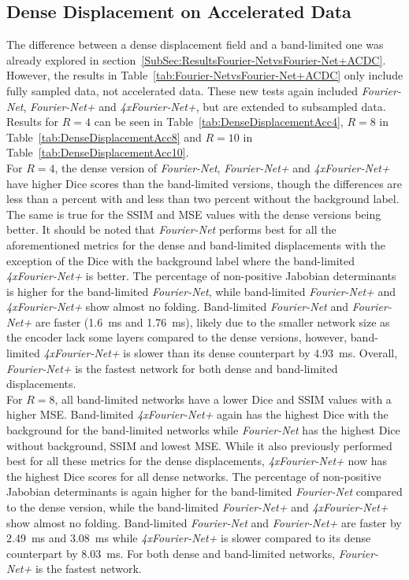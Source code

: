 \subsection{Dense Displacement on Accelerated Data} \label{SubSec:ResultsDenseDisplacementAcc}
The difference between a dense displacement field and a band-limited one was already explored in section~\ref{SubSec:ResultsFourier-NetvsFourier-Net+ACDC}. However, the results in Table~\ref{tab:Fourier-NetvsFourier-Net+ACDC} only include fully sampled data, not accelerated data. These new tests again included \emph{Fourier-Net}, \emph{Fourier-Net+} and \emph{4xFourier-Net+}, but are extended to subsampled data. Results for $R=4$ can be seen in Table~\ref{tab:DenseDisplacementAcc4}, $R=8$ in Table~\ref{tab:DenseDisplacementAcc8} and $R=10$ in Table~\ref{tab:DenseDisplacementAcc10}. \\
For $R=4$, the dense version of \emph{Fourier-Net}, \emph{Fourier-Net+} and \emph{4xFourier-Net+} have higher Dice scores than the band-limited versions, though the differences are less than a percent with and less than two percent without the background label. The same is true for the SSIM and MSE values with the dense versions being better. It should be noted that \emph{Fourier-Net} performs best for all the aforementioned metrics for the dense and band-limited displacements with the exception of the Dice with the background label where the band-limited \emph{4xFourier-Net+} is better. The percentage of non-positive Jabobian determinants is higher for the band-limited \emph{Fourier-Net}, while band-limited \emph{Fourier-Net+} and \emph{4xFourier-Net+} show almost no folding. 
Band-limited \emph{Fourier-Net} and \emph{Fourier-Net+} are faster (1.6~ms and 1.76~ms), likely due to the smaller network size as the encoder lack some layers compared to the dense versions, however, band-limited \emph{4xFourier-Net+} is slower than its dense counterpart by 4.93~ms. Overall, \emph{Fourier-Net+} is the fastest network for both dense and band-limited displacements.\\
For $R=8$, all band-limited networks have a lower Dice and SSIM values with a higher MSE. Band-limited \emph{4xFourier-Net+} again has the highest Dice with the background for the band-limited networks while \emph{Fourier-Net} has the highest Dice without background, SSIM and lowest MSE. While it also previously performed best for all these metrics for the dense displacements, \emph{4xFourier-Net+} now has the highest Dice scores for all dense networks. The percentage of non-positive Jabobian determinants is again higher for the band-limited \emph{Fourier-Net} compared to the dense version, while the band-limited \emph{Fourier-Net+} and \emph{4xFourier-Net+} show almost no folding. Band-limited \emph{Fourier-Net} and \emph{Fourier-Net+} are faster by 2.49~ms and 3.08~ms while \emph{4xFourier-Net+} is slower compared to its dense counterpart by 8.03~ms. For both dense and band-limited networks, \emph{Fourier-Net+} is the fastest network.\\
